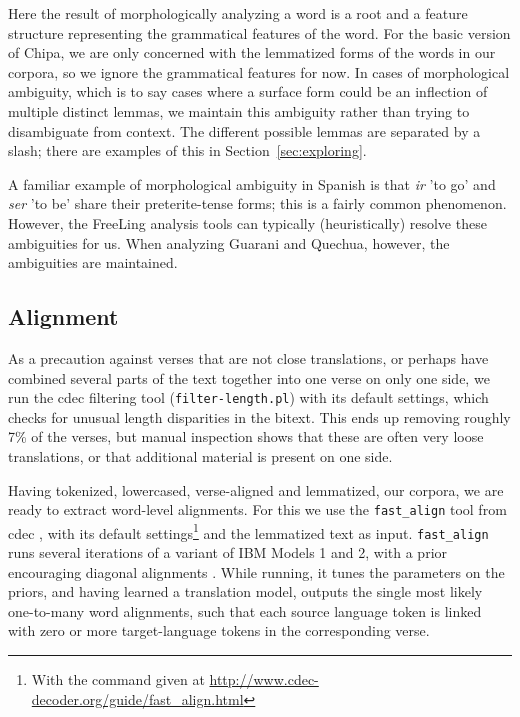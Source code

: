 Here the result of morphologically analyzing a word is a root and a feature
structure representing the grammatical features of the word.  For the basic
version of Chipa, we are only concerned with the lemmatized forms of the words
in our corpora, so we ignore the grammatical features for now.  In cases of
morphological ambiguity, which is to say cases where a surface form could be an
inflection of multiple distinct lemmas, we maintain this ambiguity rather than
trying to disambiguate from context.  The different possible lemmas are
separated by a slash; there are examples of this in
Section~\ref{sec:exploring}.



A familiar example of morphological ambiguity in Spanish is that \emph{ir} 'to
go' and \emph{ser} 'to be' share their preterite-tense forms; this is a fairly
common phenomenon. However, the FreeLing analysis tools can typically
(heuristically) resolve these ambiguities for us. When analyzing Guarani and
Quechua, however, the ambiguities are maintained.

\subsection{Alignment}
As a precaution against verses that are not close translations, or perhaps have
combined several parts of the text together into one verse on only one side, we
run the cdec filtering tool (\texttt{filter-length.pl}) with its default
settings, which checks for unusual length disparities in the bitext. This ends
up removing roughly 7\% of the verses, but manual inspection shows that these
are often very loose translations, or that additional material is present on
one side.

Having tokenized, lowercased, verse-aligned and lemmatized, our corpora, we are
ready to extract word-level alignments.
For this we use the \texttt{fast\_align} tool from cdec
\cite{dyer-EtAl:2010:Demos}, with its default settings\footnote{With the
command given at \url{http://www.cdec-decoder.org/guide/fast_align.html}} and
the lemmatized text as input.
\texttt{fast\_align} runs several iterations of a variant of IBM Models 1 and
2, with a prior encouraging diagonal alignments
\cite{dyer-EtAl:2011:ACL-HLT2011}. While running, it tunes the parameters on
the priors, and having learned a translation model, outputs the single most
likely one-to-many word alignments, such that each source language token is
linked with zero or more target-language tokens in the corresponding verse.

